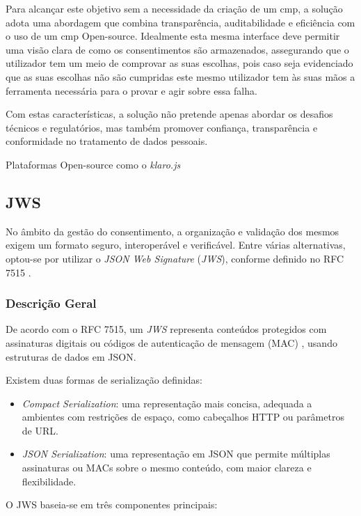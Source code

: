 Para alcançar este objetivo sem a necessidade da criação de um \acrshort{cmp}, a solução adota uma abordagem que combina transparência, auditabilidade e eficiência com o uso de um \acrshort{cmp} Open-source. Idealmente esta mesma interface deve permitir uma visão clara de como os consentimentos são armazenados, assegurando que o utilizador tem um meio de comprovar as suas escolhas, pois caso seja evidenciado que as suas escolhas não são cumpridas este mesmo utilizador tem às suas mãos a ferramenta necessária para o provar e agir sobre essa falha.

Com estas características, a solução não pretende apenas abordar os desafios técnicos e regulatórios, mas também promover confiança, transparência e conformidade no tratamento de dados pessoais.

Plataformas Open-source como o \textit{klaro.js} 
\subsection{JWS}

No âmbito da gestão do consentimento, a organização e validação dos mesmos exigem um formato seguro, interoperável e verificável. Entre várias alternativas, optou-se por utilizar o \textit{JSON Web Signature} (\textit{JWS}), conforme definido no RFC 7515 \citep{rfc7515}.

\subsubsection{Descrição Geral}

De acordo com o RFC 7515, um \textit{JWS} representa conteúdos protegidos com assinaturas digitais ou códigos de autenticação de mensagem (MAC) \citep{NISTMAC}, usando estruturas de dados em JSON.

Existem duas formas de serialização definidas:

\begin{itemize}
  \item \textit{Compact Serialization}: uma representação mais concisa, adequada a ambientes com restrições de espaço, como cabeçalhos HTTP ou parâmetros de URL.
  \item \textit{JSON Serialization}: uma representação em JSON que permite múltiplas assinaturas ou MACs sobre o mesmo conteúdo, com maior clareza e flexibilidade.
\end{itemize}

O JWS baseia-se em três componentes principais:


